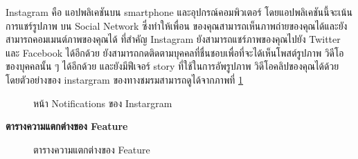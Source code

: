 \documentclass[14pt,oneside,openright,a4paper]{cpe-thai-project}
\begin{document}
\newpage

Instagram คือ แอปพลิเคชันบน smartphone และอุปกรณ์คอมพิวเตอร์ โดยแอปพลิเคชันนี้จะเน้นการแชร์รูปภาพ บน Social Network ซึ่งทำให้เพื่อน ของคุณสามารถเห็นภาพถ่ายของคุณได้และยังสามารถคอมเมนต์ภาพของคุณได้  	   ที่สำคัญ Instagram ยังสามารถแชร์ภาพของคุณไปยัง Twitter และ Facebook ได้อีกด้วย ยังสามารถกดติดตามบุคคลที่ชื่นชอบเพื่อที่จะได้เห็นโพสต์รูปภาพ วิดีโอ ของบุคคลนั้น ๆ ได้อีกด้วย และยังมีฟีเจอร์ story ที่ใช้ในการอัพรูปภาพ วิดีโอคลิปของคุณได้ด้วย โดยตัวอย่างของ instargram ของทางชมรมสามารถดูได้จากภาพที่ \ref{fig:ig}

  \begin{figure}[!h]\centering
    \setlength{\fboxrule}{0.5mm} %
    \setlength{\fboxsep}{0.5cm}
    \caption{หน้า Notifications ของ Instargram}\label{fig:ig}
    \end{figure}

\newpage

\large\textbf{ตารางความแตกต่างของ Feature}

  \begin{figure}[!h]\centering
    \setlength{\fboxrule}{0.5mm} %
    \setlength{\fboxsep}{0.5cm}
    \caption{ตารางความแตกต่างของ Feature}\label{fig:DiffFeat}
    \end{figure}
\end{document}
